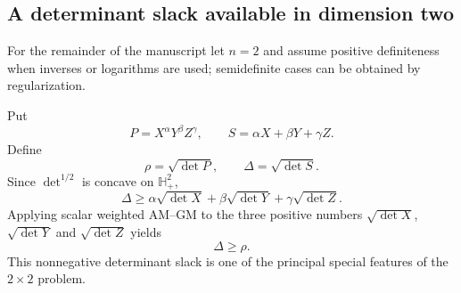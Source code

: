 \subsection{A determinant slack available in dimension two}
For the remainder of the manuscript let $n=2$ and assume positive definiteness when inverses or logarithms are used; semidefinite cases can be obtained by regularization.

Put
\[
P=X^\alpha Y^\beta Z^\gamma,
\qquad
S=\alpha X+\beta Y+\gamma Z.
\]
Define
\[
\rho=\sqrt{\det P},\qquad \Delta=\sqrt{\det S}.
\]
Since $\det^{1/2}$ is concave on $\mathbb H_+^2$,
\[
\Delta\ge \alpha\sqrt{\det X}+\beta\sqrt{\det Y}+\gamma\sqrt{\det Z}.
\]
Applying scalar weighted AM--GM to the three positive numbers $\sqrt{\det X}$, $\sqrt{\det Y}$ and $\sqrt{\det Z}$ yields
\begin{equation}
\boxed{\Delta\ge \rho.}
\label{eq:det-slack}
\end{equation}
This nonnegative determinant slack is one of the principal special features of the $2\times2$ problem.
